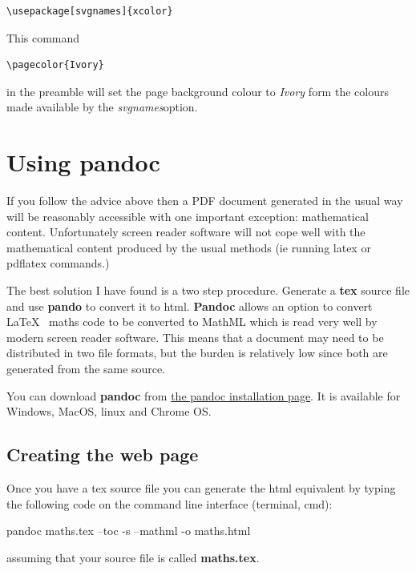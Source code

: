 \documentclass[]{article}
\begin{document}
\begin{verbatim}
\usepackage[svgnames]{xcolor}
\end{verbatim}

This command

\begin{verbatim}
\pagecolor{Ivory}
\end{verbatim}

in the preamble will set the page background colour to \emph{Ivory} form the colours made available by the \emph{svgnames}option.

\hypertarget{using-pandoc}{%
\section{\texorpdfstring{Using
\textbf{pandoc}}{Using pandoc}}\label{using-pandoc}}

If you follow the advice above then a PDF document generated in the
usual way will be reasonably accessible with one important exception:
mathematical content. Unfortunately screen reader software will not cope
well with the mathematical content produced by the usual methods (ie
running latex or pdflatex commands.)

The best solution I have found is a two step procedure. Generate a
\textbf{tex} source file and use \textbf{pando} to convert it to html.
\textbf{Pandoc} allows an option to convert \LaTeX~ maths code to be
converted to MathML which is read very well by modern screen reader
software. This means that a document may need to be distributed in two
file formats, but the burden is relatively low since both are generated
from the same source.

You can download \textbf{pandoc} from
\href{https://pandoc.org/installing.html}{the pandoc installation page}.
It is available for Windows, MacOS, linux and Chrome OS.

\hypertarget{creating-the-web-page}{%
\subsection{Creating the web page}\label{creating-the-web-page}}

Once you have a tex source file you can generate the html equivalent by
typing the following code on the command line interface (terminal, cmd):

pandoc maths.tex --toc -s --mathml -o maths.html

assuming that your source file is called \textbf{maths.tex}.
\end{document}
